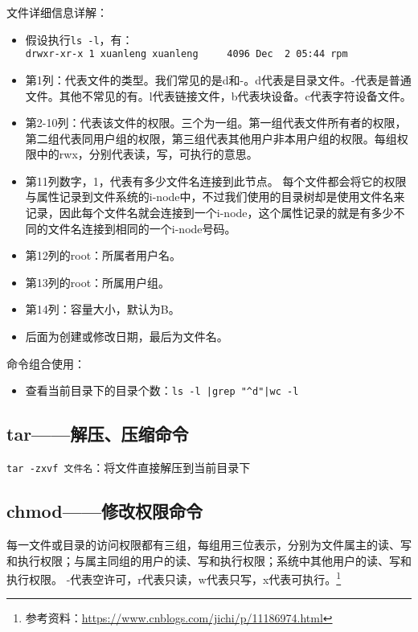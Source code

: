 文件详细信息详解：
\begin{itemize}
\item 假设执行\verb|ls -l|，有：\\
\verb|drwxr-xr-x 1 xuanleng xuanleng     4096 Dec  2 05:44 rpm|

\item 第1列：代表文件的类型。我们常见的是d和-。d代表是目录文件。-代表是普通文件。其他不常见的有。l代表链接文件，b代表块设备。c代表字符设备文件。

\item 第2-10列：代表该文件的权限。三个为一组。第一组代表文件所有者的权限，第二组代表同用户组的权限，第三组代表其他用户非本用户组的权限。每组权限中的rwx，分别代表读，写，可执行的意思。

\item 第11列数字，1，代表有多少文件名连接到此节点。
每个文件都会将它的权限与属性记录到文件系统的i-node中，不过我们使用的目录树却是使用文件名来记录，因此每个文件名就会连接到一个i-node，这个属性记录的就是有多少不同的文件名连接到相同的一个i-node号码。

\item 第12列的root：所属者用户名。

\item 第13列的root：所属用户组。

\item 第14列：容量大小，默认为B。

\item 后面为创建或修改日期，最后为文件名。
\end{itemize}

命令组合使用：
\begin{itemize}
\item 查看当前目录下的目录个数：\verb?ls -l |grep "^d"|wc -l?
\end{itemize}



\subsection{tar——解压、压缩命令}
\verb|tar -zxvf 文件名|：将文件直接解压到当前目录下



\subsection{chmod——修改权限命令}
每一文件或目录的访问权限都有三组，每组用三位表示，分别为文件属主的读、写和执行权限；与属主同组的用户的读、写和执行权限；系统中其他用户的读、写和执行权限。
-代表空许可，r代表只读，w代表只写，x代表可执行。\footnote{参考资料：\url{https://www.cnblogs.com/jichi/p/11186974.html} }

